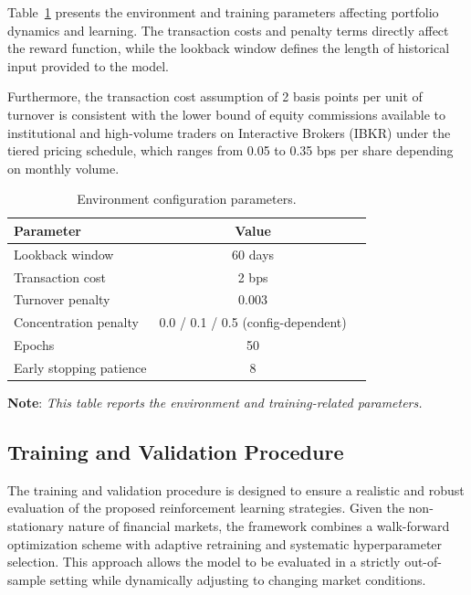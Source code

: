 \documentclass[]{elsarticle}
\begin{document}
\linespread{1.5}\selectfont

Table~\ref{tab:env_params} presents the environment and training parameters affecting portfolio dynamics and learning. The transaction costs and penalty terms directly affect the reward function, while the lookback window defines the length of historical input provided to the model.

Furthermore, the transaction cost assumption of 2 basis points per unit of turnover is consistent with the lower bound of equity commissions available to institutional and high-volume traders on Interactive Brokers (IBKR) under the tiered pricing schedule, which ranges from 0.05 to 0.35 bps per share depending on monthly volume.

\begin{table}[H]
\centering
\small
\begin{tabular}{lcc}
\toprule
\textbf{Parameter} & \textbf{Value} \\
\midrule
Lookback window & 60 days \\
Transaction cost & 2 bps \\
Turnover penalty & 0.003 \\
Concentration penalty & 0.0 / 0.1 / 0.5 (config-dependent) \\
Epochs & 50 \\
Early stopping patience & 8 \\
\bottomrule
\end{tabular}
\caption{Environment configuration parameters.}
\label{tab:env_params}
\end{table}
\vspace{-0.8cm}
\linespread{0.65}\selectfont 
\begin{center}
{\noindent\scriptsize \textbf{Note}: \textit{This table reports the environment and training-related parameters.}}
\end{center}

\linespread{1.5}\selectfont

\hypertarget{Training-and-Validation-Procedure}{%
\subsection{Training and Validation Procedure}\label{Training-and-Validation-Procedure}}

The training and validation procedure is designed to ensure a realistic and robust evaluation of the proposed reinforcement learning strategies. Given the non-stationary nature of financial markets, the framework combines a walk-forward optimization scheme with adaptive retraining and systematic hyperparameter selection. This approach allows the model to be evaluated in a strictly out-of-sample setting while dynamically adjusting to changing market conditions.
\end{document}
